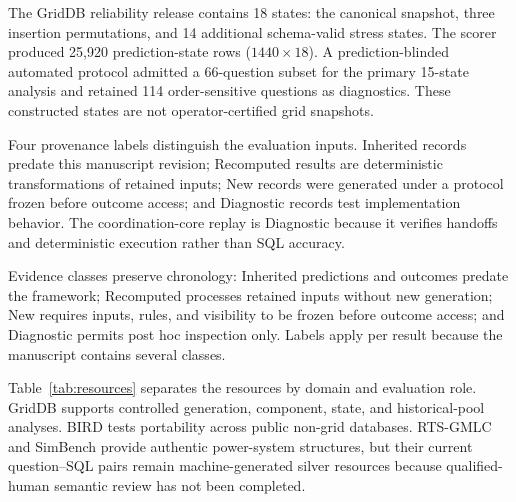 \documentclass[applsci,article,submit,moreauthors]{Definitions/mdpi}
\begin{document}
The GridDB reliability release contains 18 states: the canonical snapshot, three insertion permutations, and 14 additional schema-valid stress states. The scorer produced 25,920 prediction-state rows ($1440\times18$). A prediction-blinded automated protocol admitted a 66-question subset for the primary 15-state analysis and retained 114 order-sensitive questions as diagnostics. These constructed states are not operator-certified grid snapshots.

Four provenance labels distinguish the evaluation inputs. Inherited records predate this manuscript revision; Recomputed results are deterministic transformations of retained inputs; New records were generated under a protocol frozen before outcome access; and Diagnostic records test implementation behavior. The coordination-core replay is Diagnostic because it verifies handoffs and deterministic execution rather than SQL accuracy.

Evidence classes preserve chronology: Inherited predictions and outcomes predate the framework; Recomputed processes retained inputs without new generation; New requires inputs, rules, and visibility to be frozen before outcome access; and Diagnostic permits post hoc inspection only. Labels apply per result because the manuscript contains several classes.

Table~\ref{tab:resources} separates the resources by domain and evaluation role. GridDB supports controlled generation, component, state, and historical-pool analyses. BIRD tests portability across public non-grid databases. RTS-GMLC and SimBench provide authentic power-system structures, but their current question--SQL pairs remain machine-generated silver resources because qualified-human semantic review has not been completed.
\end{document}

